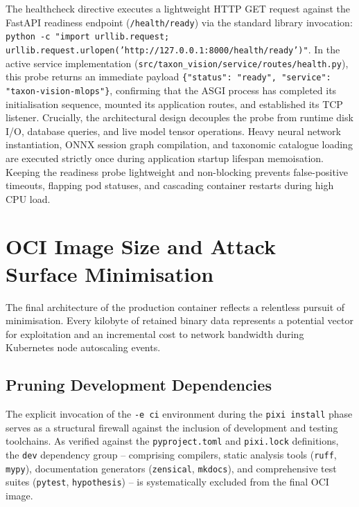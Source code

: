 The healthcheck directive executes a lightweight HTTP GET request against the FastAPI readiness endpoint (\texttt{/health/ready}) via the standard library invocation:\\
\texttt{python -c "import urllib.request;}\\ \texttt{urllib.request.urlopen('http://127.0.0.1:8000/health/ready')"}. In the active service implementation (\texttt{src/taxon\_vision/service/routes/health.py}), this probe returns an immediate payload \texttt{\{"status": "ready", "service": "taxon-vision-mlops"\}}, confirming that the ASGI process has completed its initialisation sequence, mounted its application routes, and established its TCP listener. Crucially, the architectural design decouples the probe from runtime disk I/O, database queries, and live model tensor operations. Heavy neural network instantiation, ONNX session graph compilation, and taxonomic catalogue loading are executed strictly once during application startup lifespan memoisation. Keeping the readiness probe lightweight and non-blocking prevents false-positive timeouts, flapping pod statuses, and cascading container restarts during high CPU load.

\section{OCI Image Size and Attack Surface Minimisation}
\label{sec:image_size_minimisation}

The final architecture of the production container reflects a relentless pursuit of minimisation. Every kilobyte of retained binary data represents a potential vector for exploitation and an incremental cost to network bandwidth during Kubernetes node autoscaling events.

\subsection{Pruning Development Dependencies}

The explicit invocation of the \texttt{-e ci} environment during the \texttt{pixi install} phase serves as a structural firewall against the inclusion of development and testing toolchains. As verified against the \texttt{pyproject.toml} and \texttt{pixi.lock} definitions, the \texttt{dev} dependency group -- comprising compilers, static analysis tools (\texttt{ruff}, \texttt{mypy}), documentation generators (\texttt{zensical}, \texttt{mkdocs}), and comprehensive test suites (\texttt{pytest}, \texttt{hypothesis}) -- is systematically excluded from the final OCI image.

